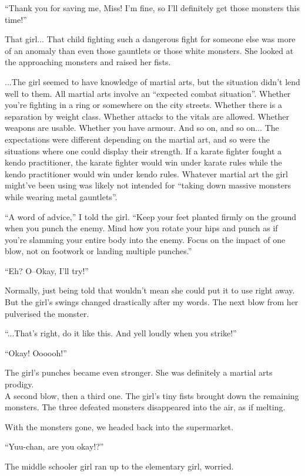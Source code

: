 ``Thank you for saving me, Miss! I'm fine, so I'll definitely get those monsters this time!''

That girl... That child fighting such a dangerous fight for someone else was more of an anomaly than even those gauntlets or those white monsters.
She looked at the approaching monsters and raised her fists.

...The girl seemed to have knowledge of martial arts, but the situation didn't lend well to them. All martial arts involve an ``expected combat situation''. Whether you're fighting in a ring or somewhere on the city streets.  Whether there is a separation by weight class. Whether attacks to the vitals are allowed. Whether weapons are usable. Whether you have armour.  And so on, and so on... The expectations were different depending on the martial art, and so were the situations where one could display their strength. If a karate fighter fought a kendo practitioner, the karate fighter would win under karate rules while the kendo practitioner would win under kendo rules. Whatever martial art the girl might've been using was likely not intended for ``taking down massive monsters while wearing metal gauntlets''.

``A word of advice,'' I told the girl. ``Keep your feet planted firmly on the ground when you punch the enemy. Mind how you rotate your hips and punch as if you're slamming your entire body into the enemy. Focus on the impact of one blow, not on footwork or landing multiple punches.''

``Eh? O--Okay, I'll try!''

Normally, just being told that wouldn't mean she could put it to use right away. But the girl's swings changed drastically after my words. The next blow from her pulverised the monster.

``...That's right, do it like this. And yell loudly when you strike!''

``Okay! Oooooh!''

The girl's punches became even stronger. She was definitely a martial arts prodigy. \\
A second blow, then a third one. The girl's tiny fists brought down the remaining monsters. The three defeated monsters disappeared into the air, as if melting.

With the monsters gone, we headed back into the supermarket.

``Yuu-chan, are you okay!?''

The middle schooler girl ran up to the elementary girl, worried.

